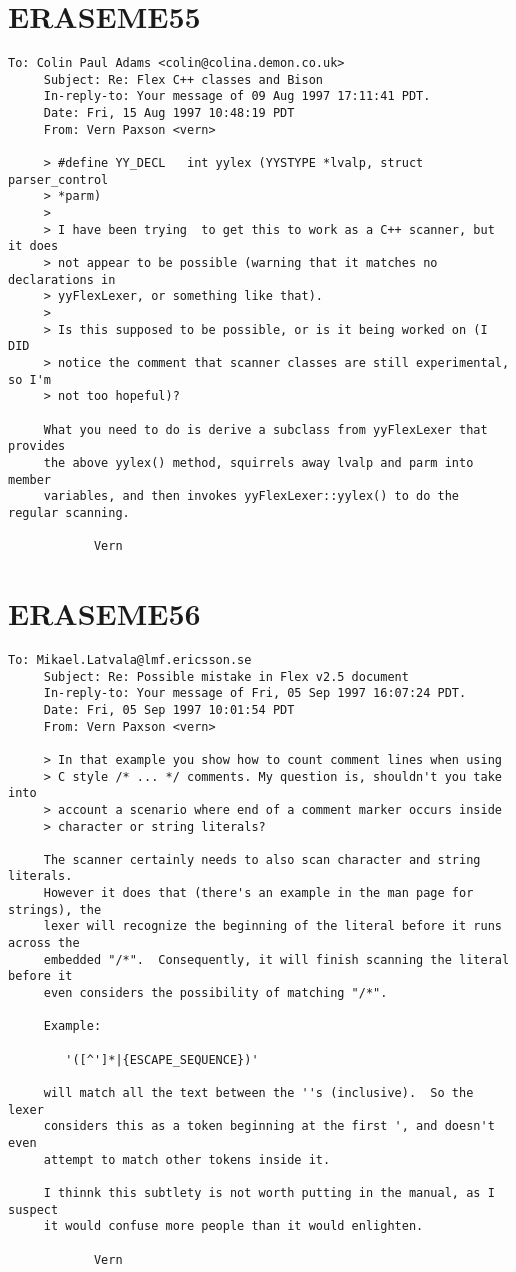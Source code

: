 \documentclass[openany,oneside]{book}
\begin{document}
\section{ERASEME55}

\begin{verbatim}
To: Colin Paul Adams <colin@colina.demon.co.uk>
     Subject: Re: Flex C++ classes and Bison
     In-reply-to: Your message of 09 Aug 1997 17:11:41 PDT.
     Date: Fri, 15 Aug 1997 10:48:19 PDT
     From: Vern Paxson <vern>
     
     > #define YY_DECL   int yylex (YYSTYPE *lvalp, struct parser_control
     > *parm)
     >
     > I have been trying  to get this to work as a C++ scanner, but it does
     > not appear to be possible (warning that it matches no declarations in
     > yyFlexLexer, or something like that).
     >
     > Is this supposed to be possible, or is it being worked on (I DID
     > notice the comment that scanner classes are still experimental, so I'm
     > not too hopeful)?
     
     What you need to do is derive a subclass from yyFlexLexer that provides
     the above yylex() method, squirrels away lvalp and parm into member
     variables, and then invokes yyFlexLexer::yylex() to do the regular scanning.
     
     		Vern
\end{verbatim}

\section{ERASEME56}

\begin{verbatim}
To: Mikael.Latvala@lmf.ericsson.se
     Subject: Re: Possible mistake in Flex v2.5 document
     In-reply-to: Your message of Fri, 05 Sep 1997 16:07:24 PDT.
     Date: Fri, 05 Sep 1997 10:01:54 PDT
     From: Vern Paxson <vern>
     
     > In that example you show how to count comment lines when using
     > C style /* ... */ comments. My question is, shouldn't you take into
     > account a scenario where end of a comment marker occurs inside
     > character or string literals?
     
     The scanner certainly needs to also scan character and string literals.
     However it does that (there's an example in the man page for strings), the
     lexer will recognize the beginning of the literal before it runs across the
     embedded "/*".  Consequently, it will finish scanning the literal before it
     even considers the possibility of matching "/*".
     
     Example:
     
     	'([^']*|{ESCAPE_SEQUENCE})'
     
     will match all the text between the ''s (inclusive).  So the lexer
     considers this as a token beginning at the first ', and doesn't even
     attempt to match other tokens inside it.
     
     I thinnk this subtlety is not worth putting in the manual, as I suspect
     it would confuse more people than it would enlighten.
     
     		Vern
\end{verbatim}
\end{document}
